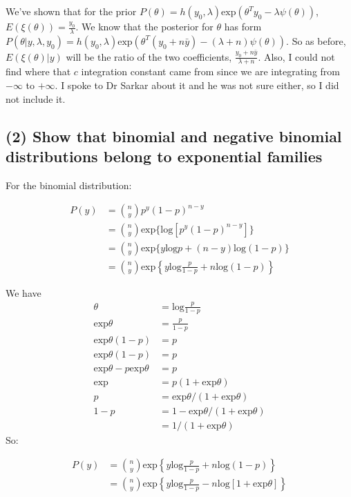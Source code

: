 \documentclass[11pt]{article}
\begin{document}
We've shown that for the prior $P(\theta) = h(y_0, \lambda)\text{exp}(\theta^T y_0 - \lambda \psi(\theta))$, $E(\xi(\theta)) = \frac{y_0}{\lambda}$. We know that the posterior for $\theta$ has form $P(\theta|y, \lambda, y_0) =  h(y_0, \lambda)\text{exp}(\theta^T(y_0 + n\bar{y}) - (\lambda + n) \psi(\theta))$. So as before, $E(\xi(\theta)|y)$ will be the ratio of the two coefficients, $\frac{y_0+n\bar{y}}{\lambda+n}$. Also, I could not find where that $c$ integration constant came from since we are integrating from $-\infty$ to $+\infty$. I spoke to Dr Sarkar about it and he was not sure either, so I did not include it.


\subsection*{(2) Show that binomial and negative binomial distributions belong to exponential families}

For the binomial distribution:

\begin{align*}
    P(y) &= {n \choose y}p^y(1-p)^{n-y}\\
    &=  {n \choose y}\text{exp}\{\text{log}[p^y(1-p)^{n-y}]\}\\
     &=  {n \choose y}\text{exp}\{y\text{log}p +(n-y)\text{log}(1-p)\}\\
     &=  {n \choose y}\text{exp}\left \{y\text{log}\frac{p}{1-p} +n\text{log}(1-p)\right \}
\end{align*}

We have 
\begin{align*}
    \theta &= \text{log}\frac{p}{1-p} \\
    \text{exp}\theta &= \frac{p}{1-p} \\
     \text{exp}\theta(1-p) &=p \\
      \text{exp}\theta(1-p) &=p \\
      \text{exp}\theta - p\text{exp}\theta &=p \\
            \text{exp}  &=p(1+\text{exp}\theta) \\
             p  &=\text{exp}\theta/(1+\text{exp}\theta) \\
               1-p  &=1-\text{exp}\theta/(1+\text{exp}\theta) \\
               &=1/(1+\text{exp}\theta) 
\end{align*}
So:

\begin{align*}
    P(y) &=  {n \choose y}\text{exp}\left \{y\text{log}\frac{p}{1-p} +n\text{log}(1-p)\right \}\\
    &=  {n \choose y}\text{exp}\left \{y\text{log}\frac{p}{1-p} -n\text{log}[1+\text{exp}\theta]\right \}
\end{align*}
\end{document}
